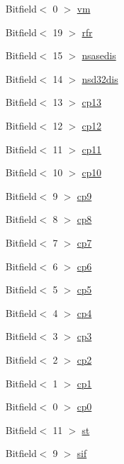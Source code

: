 \begin{DoxyCompactItemize}
\item 
Bitfield$<$ 0 $>$ \hyperlink{namespaceArmISA_a74830881d990d681c2c1def45223195e}{vm}
\item 
Bitfield$<$ 19 $>$ \hyperlink{namespaceArmISA_ab7aa8d0a5ff89ae54997a67604e84e60}{rfr}
\item 
Bitfield$<$ 15 $>$ \hyperlink{namespaceArmISA_a3083a0bbb02155525b620113337b0df9}{nsasedis}
\item 
Bitfield$<$ 14 $>$ \hyperlink{namespaceArmISA_a8d8a976ccbfdd584ef0c1b448bd0485c}{nsd32dis}
\item 
Bitfield$<$ 13 $>$ \hyperlink{namespaceArmISA_a5fc4e5b40593c3b5494e5b3ed1ac98ce}{cp13}
\item 
Bitfield$<$ 12 $>$ \hyperlink{namespaceArmISA_a6fa0e81517af0486b6373c4592c8f50a}{cp12}
\item 
Bitfield$<$ 11 $>$ \hyperlink{namespaceArmISA_a50a7bf8cd6a8a812a1e384956cdcf73d}{cp11}
\item 
Bitfield$<$ 10 $>$ \hyperlink{namespaceArmISA_a54ce12016272ddac331481486fb2c99c}{cp10}
\item 
Bitfield$<$ 9 $>$ \hyperlink{namespaceArmISA_a3eb3eb4bfe35d9165be3f392aaa11635}{cp9}
\item 
Bitfield$<$ 8 $>$ \hyperlink{namespaceArmISA_a83c93d9065937906eefc245d8fb9317b}{cp8}
\item 
Bitfield$<$ 7 $>$ \hyperlink{namespaceArmISA_a82812c98b3ec268b6ba0007a4656cc7d}{cp7}
\item 
Bitfield$<$ 6 $>$ \hyperlink{namespaceArmISA_ad0a8cbe56ee2e20d1812e1296450ee2c}{cp6}
\item 
Bitfield$<$ 5 $>$ \hyperlink{namespaceArmISA_a39df79e0c87a3e2fd2be8adbba5ccf83}{cp5}
\item 
Bitfield$<$ 4 $>$ \hyperlink{namespaceArmISA_ac2e6e3484bf52df30c90da02f343c4ef}{cp4}
\item 
Bitfield$<$ 3 $>$ \hyperlink{namespaceArmISA_a0248064d96e2facf88f4db51a22c686d}{cp3}
\item 
Bitfield$<$ 2 $>$ \hyperlink{namespaceArmISA_ae66948de439c88649255c5e0ea08167d}{cp2}
\item 
Bitfield$<$ 1 $>$ \hyperlink{namespaceArmISA_a81353fa5dd80e6bec3541cd114945d02}{cp1}
\item 
Bitfield$<$ 0 $>$ \hyperlink{namespaceArmISA_ad4895350e7ce587ce663f988f4496d6f}{cp0}
\item 
Bitfield$<$ 11 $>$ \hyperlink{namespaceArmISA_ae9ccb60923e03f5112b726ef11e2d299}{st}
\item 
Bitfield$<$ 9 $>$ \hyperlink{namespaceArmISA_a468ae50b65fdafb1a99a03673c48bacc}{sif}

\end{DoxyCompactItemize}
